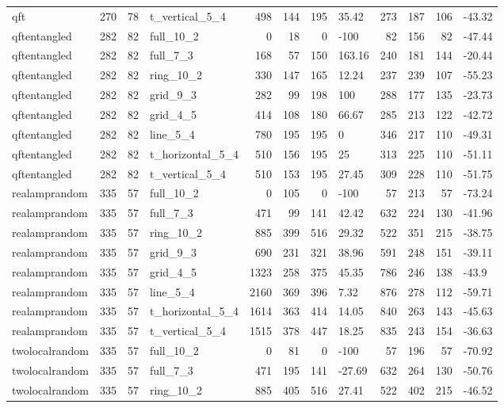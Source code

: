 \begin{longtable}{lrrlrrrlrrrl}
qft & 270 & 78 & t\_vertical\_5\_4 & 498 & 144 & 195 & 35.42 & 273 & 187 & 106 & -43.32 \\
qftentangled & 282 & 82 & full\_10\_2 & 0 & 18 & 0 & -100 & 82 & 156 & 82 & -47.44 \\
qftentangled & 282 & 82 & full\_7\_3 & 168 & 57 & 150 & 163.16 & 240 & 181 & 144 & -20.44 \\
qftentangled & 282 & 82 & ring\_10\_2 & 330 & 147 & 165 & 12.24 & 237 & 239 & 107 & -55.23 \\
qftentangled & 282 & 82 & grid\_9\_3 & 282 & 99 & 198 & 100 & 288 & 177 & 135 & -23.73 \\
qftentangled & 282 & 82 & grid\_4\_5 & 414 & 108 & 180 & 66.67 & 285 & 213 & 122 & -42.72 \\
qftentangled & 282 & 82 & line\_5\_4 & 780 & 195 & 195 & 0 & 346 & 217 & 110 & -49.31 \\
qftentangled & 282 & 82 & t\_horizontal\_5\_4 & 510 & 156 & 195 & 25 & 313 & 225 & 110 & -51.11 \\
qftentangled & 282 & 82 & t\_vertical\_5\_4 & 510 & 153 & 195 & 27.45 & 309 & 228 & 110 & -51.75 \\
realamprandom & 335 & 57 & full\_10\_2 & 0 & 105 & 0 & -100 & 57 & 213 & 57 & -73.24 \\
realamprandom & 335 & 57 & full\_7\_3 & 471 & 99 & 141 & 42.42 & 632 & 224 & 130 & -41.96 \\
realamprandom & 335 & 57 & ring\_10\_2 & 885 & 399 & 516 & 29.32 & 522 & 351 & 215 & -38.75 \\
realamprandom & 335 & 57 & grid\_9\_3 & 690 & 231 & 321 & 38.96 & 591 & 248 & 151 & -39.11 \\
realamprandom & 335 & 57 & grid\_4\_5 & 1323 & 258 & 375 & 45.35 & 786 & 246 & 138 & -43.9 \\
realamprandom & 335 & 57 & line\_5\_4 & 2160 & 369 & 396 & 7.32 & 876 & 278 & 112 & -59.71 \\
realamprandom & 335 & 57 & t\_horizontal\_5\_4 & 1614 & 363 & 414 & 14.05 & 840 & 263 & 143 & -45.63 \\
realamprandom & 335 & 57 & t\_vertical\_5\_4 & 1515 & 378 & 447 & 18.25 & 835 & 243 & 154 & -36.63 \\
twolocalrandom & 335 & 57 & full\_10\_2 & 0 & 81 & 0 & -100 & 57 & 196 & 57 & -70.92 \\
twolocalrandom & 335 & 57 & full\_7\_3 & 471 & 195 & 141 & -27.69 & 632 & 264 & 130 & -50.76 \\
twolocalrandom & 335 & 57 & ring\_10\_2 & 885 & 405 & 516 & 27.41 & 522 & 402 & 215 & -46.52 \\

\end{longtable}
